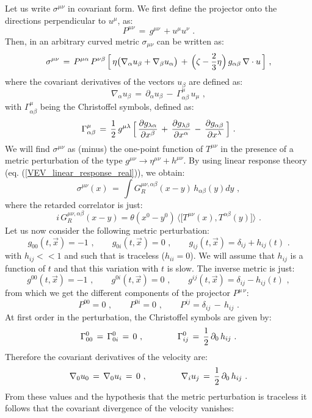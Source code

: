 \documentclass[12pt,notitlepage,a4paper]{article}
\newcommand{\beq}{\begin{equation}}
\newcommand{\eeq}{\end{equation}}
\begin{document}
Let us write $\sigma^{\mu\nu}$ in covariant form. We first define the projector onto the directions perpendicular to $u^{\mu}$, as:
\beq
P^{\mu\nu}\,=\,g^{\mu\nu}\,+u^{\mu} u^{\nu}\,\,.
\eeq
Then, in an arbitrary curved metric $\sigma_{\mu\nu}$ can be written as:
\beq
\sigma^{\mu\nu}\,=\,P^{\mu\alpha}\,P^{\nu\beta}\,\Big[\,
\eta \big(\nabla_{\alpha} u_{\beta}+\nabla_{\beta}u_{\alpha}\big)\,+\,
\Big(\zeta-{2\over 3}\eta\Big)\,g_{\alpha\beta}\,\nabla\cdot u\,\Big]\,\,,
\eeq
where the covariant derivatives  of the vectors $u_{\beta}$ are defined as:
\beq
\nabla_{\alpha} u_{\beta}\,=\,\partial_{\alpha} u_{\beta}\,-\,
\Gamma_{\alpha\beta}^{\mu}\,u_{\mu}\,\,,
\eeq
with $\Gamma_{\alpha\beta}^{\mu}$ being the Christoffel symbols, defined as:
\beq
\Gamma_{\alpha\beta}^{\mu}\,=\,{1\over 2}\,g^{\mu\lambda}\,
\Big[\,{\partial g_{\lambda\alpha}\over \partial x^{\beta}}\,+\,
{\partial g_{\lambda\beta}\over \partial x^{\alpha}}\,-\,
{\partial g_{\alpha\beta}\over \partial x^{\lambda}}\,\Big]\,\,.
\eeq
We will find $\sigma^{\mu\nu}$ as  (minus) the one-point function of $T^{\mu\nu}$ in the presence of a metric perturbation of the type $g^{\mu\nu}\to \eta^{\mu\nu}+h^{\mu\nu}$. By using linear response theory (eq.  (\ref{VEV_linear_response_real})),  we obtain:
\beq
\sigma^{\mu\nu}(x)\,=\,\int G_{R}^{\mu\nu, \alpha\beta} (x-y)\,h_{\alpha\beta} (y) dy\,\,,
\eeq
where the retarded correlator is just:
\beq
i\,G_{R}^{\mu\nu, \alpha\beta} (x-y)=\theta(x^0-y^0)\,
\langle \big[T^{\mu\nu}(x), T^{\alpha\beta}(y)\big]\rangle\,\,.
\eeq
Let us now  consider the following metric perturbation:
\beq
g_{00}(t,\vec x)=-1\,\,,
\qquad
g_{0i}(t,\vec x)=0\,\,,
\qquad
g_{ij}(t,\vec x)=\delta_{ij}+h_{ij}(t)\,\,.
\eeq
with $h_{ij}<<1$ and such that is traceless ($h_{ii}=0$). We will assume that 
$h_{ij}$ is a function of $t$ and that this variation with $t$ is slow.
The inverse metric is just:
\beq
g^{00}(t,\vec x)=-1\,\,,
\qquad
g^{0i}(t,\vec x)=0\,\,,
\qquad
g^{ij}(t,\vec x)=\delta_{ij}-h_{ij}(t)\,\,,
\eeq
from which we get the different components of the projector $P^{\mu\,\nu}$:
\beq
P^{00}=0\,\,,
\qquad
P^{0i}=0\,\,,
\qquad
P^{ij}=\delta_{ij}\,-\,h_{ij}\,\,.
\eeq
At first order in the perturbation, the Christoffel symbols are given by:
\beq
\Gamma_{00}^{0}\,=\,\Gamma_{0i}^{0}\,=\,0\,\,,
\qquad\qquad
\Gamma_{ij}^{0}\,=\,{1\over 2}\,\partial_{0}\, h_{ij}\,\,.
\eeq
Therefore the covariant derivatives of the velocity are:
\beq
\nabla_{0} u_{0}\,=\,\nabla_{0} u_{i}\,=\,0\,\,,
\qquad\qquad
\nabla_{i} u_{j}\,=\,{1\over 2}\,\partial_{0}\, h_{ij}\,\,.
\eeq
From these values and the hypothesis that the metric perturbation is traceless it follows that the covariant divergence of the velocity vanishes:
\end{document}
